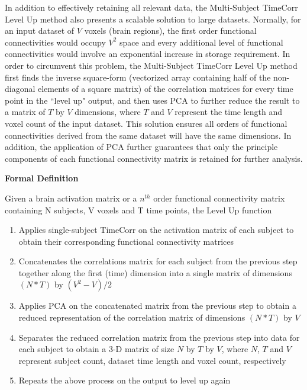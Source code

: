 \documentclass[11pt]{article}
\begin{document}
In addition to effectively retaining all relevant data, the Multi-Subject TimeCorr Level Up method also presents a scalable solution to large datasets. Normally, for an input dataset of $V$ voxels (brain regions), the first order functional connectivities would occupy $V^2$ space and every additional level of functional connectivities would involve an exponential increase in storage requirement. In order to circumvent this problem, the Multi-Subject TimeCorr Level Up method first finds the inverse square-form (vectorized array containing half of the non-diagonal elements of a square matrix) of the correlation matrices for every time point in the ``level up" output, and then uses PCA to further reduce the result to a matrix of $T$ by $V$ dimensions, where $T$ and $V$ represent the time length and voxel count of the input dataset. This solution ensures all orders of functional connectivities derived from the same dataset will have the same dimensions. In addition, the application of PCA further guarantees that only the principle components of each functional connectivity matrix is retained for further analysis.

\large{\textbf{Formal Definition}}

\normalsize
Given a brain activation matrix or a $n^{th}$ order functional connectivity matrix containing N subjects, V voxels and T time points, the Level Up function

\begin{enumerate}
\item Applies single-subject TimeCorr on the activation matrix of each subject to obtain their corresponding functional connectivity matrices

\item Concatenates the correlations matrix for each subject from the previous step together along the first (time) dimension into a single matrix of dimensions $(N*T)$ by $(V^2-V)/2$

\item Applies PCA on the concatenated matrix from the previous step to obtain a reduced representation of the correlation matrix of dimensions $(N*T)$ by $V$

\item Separates the reduced correlation matrix from the previous step into data for each subject to obtain a 3-D matrix of size $N$ by $T$ by $V$, where $N$, $T$ and $V$ represent subject count, dataset time length and voxel count, respectively

\item Repeats the above process on the output to level up again

\end{enumerate}
\end{document}
